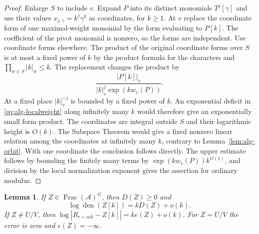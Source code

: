 \documentclass[11pt,a4paper,reqno]{amsart}
\newtheorem{lemma}[theorem]{Lemma}
\theoremstyle{definition}
\theoremstyle{remark}
\numberwithin{equation}{section}
\begin{document}
\begin{proof}
Enlarge \(S\) to include \(v\). Expand \(P\) into its distinct
monomials \(T^j[\gamma]\) and use their values
\(x_{j,\gamma}=k^j\gamma^k\) as coordinates, for \(k\ge1\).
At \(v\) replace the coordinate form of one maximal-weight monomial
by the form evaluating to \(P[k]\). The coefficient of the pivot
monomial is nonzero, so the forms are independent. Use coordinate
forms elsewhere. The product of the original coordinate forms over
\(S\) is at most a fixed power of \(k\) by the product formula for the
characters and \(\prod_{w\in S}|k|_w\le k\). The replacement changes
the product by
\[
 \frac{|P[k]|_v}{|k|_v^j\exp(k w_v(P))}.
\]
At a fixed place \(|k|_v^{-j}\) is bounded by a fixed power of \(k\).
An exponential deficit in \eqref{eq:alg-localweight} along infinitely
many \(k\) would therefore give an exponentially small form product.
The coordinates are integral outside \(S\) and their logarithmic
height is \(O(k)\). The Subspace Theorem would give a fixed nonzero
linear relation among the coordinates at infinitely many \(k\),
contrary to Lemma~\ref{lem:alg-orbit}. With one coordinate the
conclusion follows directly. The upper estimate follows by bounding
the finitely many terms by \(\exp(k w_v(P))k^{O(1)}\), and division by
the local normalization exponent gives the assertion for ordinary
modulus.
\end{proof}

\begin{lemma}\label{lem:alg-slopes}
If \(Z\in\operatorname{Frac}(\mathcal A)^G\), then \(D(Z)\ge0\) and
\[
 \log\operatorname{den}(Z[k])=kD(Z)+o(k).
\]
If \(Z\ne U/V\), then
\(\log|R_{r+mk}-Z[k]|=ke(Z)+o(k)\). For \(Z=U/V\) the error is zero
and \(e(Z)=-\infty\).
\end{lemma}
\end{document}
